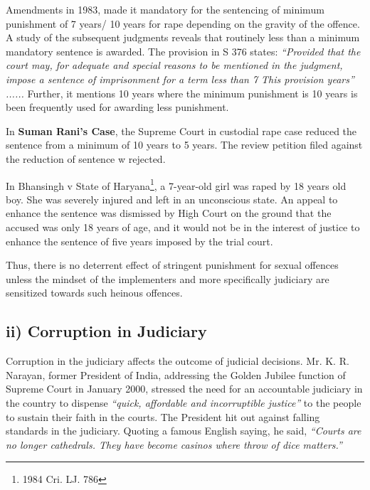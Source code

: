 \begin{multicols}{2}
\vspace{-.2cm}

\noi
Amendments in 1983, made it mandatory for the sentencing of minimum punishment
of 7 years/ 10 years for rape depending on the gravity of the offence. A study of the
subsequent judgments reveals that routinely less than a minimum mandatory sentence
is awarded. The provision in S 376 states: \textit{“Provided that the court may, for adequate
and special reasons to be mentioned in the judgment, impose a sentence of
imprisonment for a term less than 7 This provision years” ......} Further, it mentions 10
years where the minimum punishment is 10 years is been frequently used for awarding
less punishment.

\noi
In \textbf{Suman Rani's Case}, the Supreme Court in custodial rape case reduced the sentence
from a minimum of 10 years to 5 years. The review petition filed against the reduction
of sentence w rejected.	

\noi
In Bhansingh v State of Haryana\footnote{1984 Cri. LJ. 786}, a 7-year-old girl was raped by 18 years old boy.
She was severely injured and left in an unconscious state. An appeal to enhance the
sentence was dismissed by High Court on the ground that the accused was only 18 years
of age, and it would not be in the interest of justice to enhance the sentence of five years
imposed by the trial court.

\noi
Thus, there is no deterrent effect of stringent punishment for sexual offences unless the
mindset of the implementers and more specifically judiciary are sensitized towards such
heinous offences.


\vspace{-.3cm}

\subsection*{ii) Corruption in Judiciary}

\noi
Corruption in the judiciary affects the outcome of judicial decisions. Mr. K. R. Narayan,
former President of India, addressing the Golden Jubilee function of Supreme Court in
January 2000, stressed the need for an accountable judiciary in the country to dispense \textit{“quick, affordable and incorruptible justice”} to the people to sustain their faith in the
courts. The President hit out against falling standards in the judiciary. Quoting a famous
English saying, he said, \textit{“Courts are no longer cathedrals. They have become casinos
where throw of dice matters.”}


\end{multicols}
